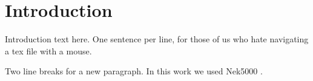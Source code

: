 
\section{Introduction}
\label{s:intro}

Introduction text here.
One sentence per line, for those of us who hate navigating a tex file with a mouse.

Two line breaks for a new paragraph.
In this work we used Nek5000 \cite{nek5000}.
